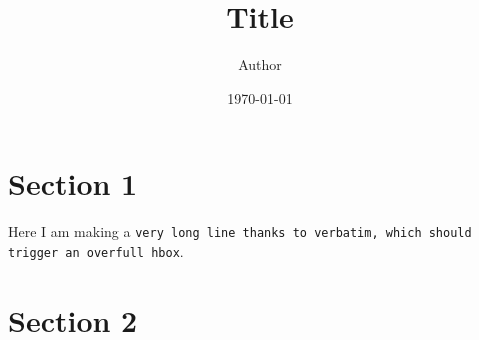 \documentclass[10pt]{article}
\title{Title}
\author{Author}
\date{\today}
\begin{document}
\maketitle

\section{Section 1}
\label{sec:section-1}

Here I am making a \verb+very long line thanks to verbatim, which should trigger an overfull hbox+.


\section{Section 2}
\label{sec:section-2}
\end{document}
